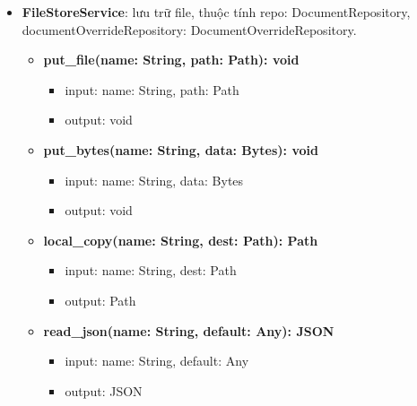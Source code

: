 \begin{itemize}[label=\textbullet, itemsep=0.4em]
\begin{itemize}[label=$\circ$, itemsep=0.2em, leftmargin=1.5em]
\begin{itemize}[label=$\blacksquare$, itemsep=0.1em, leftmargin=1.5em]
      \item output: JSON
    \end{itemize}
    \item \textbf{update\_toc(document\_id: String, body: JSON): JSON}
    \begin{itemize}[label=$\blacksquare$, itemsep=0.1em, leftmargin=1.5em]
      \item input: document\_id: String, body: JSON
      \item output: JSON
    \end{itemize}
  \end{itemize}
  \item \textbf{FileStoreService}: lưu trữ file, thuộc tính repo: DocumentRepository, documentOverrideRepository: DocumentOverrideRepository.
  \begin{itemize}[label=$\circ$, itemsep=0.2em, leftmargin=1.5em]
    \item \textbf{put\_file(name: String, path: Path): void}
    \begin{itemize}[label=$\blacksquare$, itemsep=0.1em, leftmargin=1.5em]
      \item input: name: String, path: Path
      \item output: void
    \end{itemize}
    \item \textbf{put\_bytes(name: String, data: Bytes): void}
    \begin{itemize}[label=$\blacksquare$, itemsep=0.1em, leftmargin=1.5em]
      \item input: name: String, data: Bytes
      \item output: void
    \end{itemize}
    \item \textbf{local\_copy(name: String, dest: Path): Path}
    \begin{itemize}[label=$\blacksquare$, itemsep=0.1em, leftmargin=1.5em]
      \item input: name: String, dest: Path
      \item output: Path
    \end{itemize}
    \item \textbf{read\_json(name: String, default: Any): JSON}
    \begin{itemize}[label=$\blacksquare$, itemsep=0.1em, leftmargin=1.5em]
      \item input: name: String, default: Any
      \item output: JSON
    \end{itemize}

\end{itemize}
\end{itemize}
